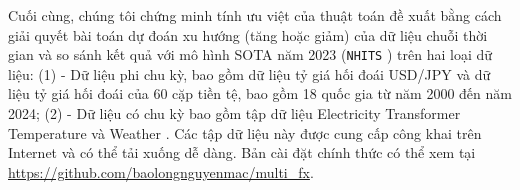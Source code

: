 \documentclass[aps,prb,groupedaddress,twocolumn,showpacs,dvipdfmx,superscriptaddress,pdftex]{revtex4-2}
\begin{document}

\vspace{2mm}

Cuối cùng, chúng tôi chứng minh tính ưu việt của thuật toán đề xuất bằng cách giải quyết bài toán dự đoán xu hướng (tăng hoặc giảm) của dữ liệu chuỗi thời gian và so sánh kết quả với mô hình SOTA năm 2023 (\verb|NHITS| \cite{challu2023nhits}) trên hai loại dữ liệu: (1) - Dữ liệu phi chu kỳ, bao gồm dữ liệu tỷ giá hối đoái USD/JPY và dữ liệu tỷ giá hối đoái của 60 cặp tiền tệ, bao gồm 18 quốc gia từ năm 2000 đến năm 2024; (2) - Dữ liệu có chu kỳ bao gồm tập dữ liệu Electricity Transformer Temperature \cite{zhou2021informer} và Weather \cite{Kolle}. Các tập dữ liệu này được cung cấp công khai trên Internet và có thể tải xuống dễ dàng. Bản cài đặt chính thức có thể xem tại \url{https://github.com/baolongnguyenmac/multi_fx}.

\end{document}
